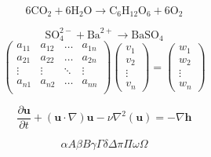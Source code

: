 \documentclass{article}
\begin{document}
  \begin{equation}
    6\text{CO}_2 + 6\text{H}_2\text{O} \rightarrow \text{C}_6\text{H}_{12}\text{O}_6 + 6\text{O}_2
  \end{equation}

  \begin{equation}
    \text{SO}_4^{2-} + \text{Ba}^{2+} \rightarrow \text{BaSO}_4
  \end{equation}
  \begin{equation}
    \begin{pmatrix}
      a_{11} & a_{12} & \ldots & a_{1n} \\
      a_{21} & a_{22} & \ldots & a_{2n} \\
      \vdots & \vdots & \ddots & \vdots \\
      a_{n1} & a_{n2} & \ldots & a_{nn} \\
    \end{pmatrix}
    \begin{pmatrix}
      v_1 \\
      v_2 \\
      \vdots \\
      v_n
    \end{pmatrix}
    =
    \begin{pmatrix}
      w_1 \\
      w_2 \\
      \vdots \\
      w_n      
    \end{pmatrix}
  \end{equation}

  \begin{equation}
    \frac{\partial \mathbf{u}}{\partial t} + (\mathbf{u} \cdot \nabla)\mathbf{u} - \nu\nabla^2(\mathbf{u}) = -\nabla \mathbf{h}
  \end{equation}

  \begin{equation}
    \alpha A \beta B \gamma\Gamma \delta\Delta \pi\Pi \omega\Omega
  \end{equation}
\end{document}
